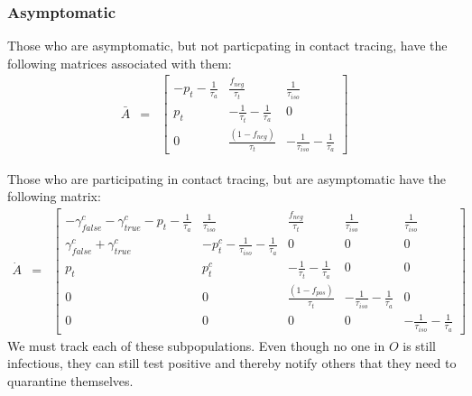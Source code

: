 \documentclass{article}
\begin{document}
\subsubsection{Asymptomatic}
Those who are asymptomatic, but not particpating in contact tracing, have the following matrices associated with them:
\begin{eqnarray}
\bar{A} &=&
\begin{bmatrix}
- p_{t} -\frac{1}{\tau_{a}}  &  \frac{f_{neg}}{\tau_{t}}            & \frac{1}{\tau_{iso}} \\ 
 p_{t}              & -\frac{1}{\tau_{t}} -\frac{1}{\tau_{a}}       & 0  \\ 
 0                  & \frac{(1- f_{neg})}{\tau_{t}}                        & -\frac{1}{\tau_{iso}} -\frac{1}{\tau_{a}}
\end{bmatrix}
\end{eqnarray}

Those who are participating in contact tracing, but are asymptomatic have the following matrix:
\begin{eqnarray}
\dot{A} &=&
\begin{bmatrix}
 -\gamma^{c}_{false} -\gamma^{c}_{true} - p_{t} -\frac{1}{\tau_{a}} & \frac{1}{\tau_{iso}}  & \frac{f_{neg}}{\tau_{t}} & \frac{1}{\tau_{iso}} & \frac{1}{\tau_{iso}} \\
\gamma^{c}_{false} + \gamma^{c}_{true}    &  -p^{c}_{t}  - \frac{1}{\tau_{iso}} - \frac{1}{\tau_{a}}      &  0    & 0  & 0\\
p_{t}     &  p^{c}_{t}                  &  -\frac{1}{\tau_{t}}  - \frac{1}{\tau_{a}}  & 0 & 0\\
0 & 0 & \frac{(1-f_{pos})}{\tau_{t}}  & -\frac{1}{\tau_{iso}}  -  \frac{1}{\tau_{a}} & 0 \\ 
0 & 0 & 0 & 0 & -\frac{1}{\tau_{iso}}  -  \frac{1}{\tau_{a}}
\end{bmatrix}
\end{eqnarray}
We must track each of these subpopulations. Even though no one in $O$ is still infectious, they can still test positive and thereby notify others that they need to quarantine themselves. 
\end{document}

